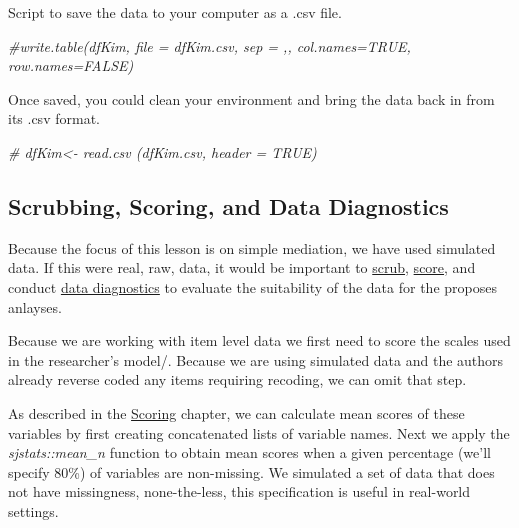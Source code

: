 \documentclass[
  11pt,
]{book}
\newenvironment{Shaded}{\begin{snugshade}}{\end{snugshade}}
\newcommand{\CommentTok}[1]{\textcolor[rgb]{0.37,0.37,0.37}{\textit{#1}}}
\begin{document}
Script to save the data to your computer as a .csv file.

\begin{Shaded}
\begin{Highlighting}[]
\CommentTok{\#write.table(dfKim, file = \textquotesingle{}dfKim.csv\textquotesingle{}, sep = \textquotesingle{},\textquotesingle{}, col.names=TRUE, row.names=FALSE) }
\end{Highlighting}
\end{Shaded}

Once saved, you could clean your environment and bring the data back in from its .csv format.

\begin{Shaded}
\begin{Highlighting}[]
\CommentTok{\# dfKim\textless{}{-} read.csv (\textquotesingle{}dfKim.csv\textquotesingle{}, header = TRUE)}
\end{Highlighting}
\end{Shaded}

\hypertarget{scrubbing-scoring-and-data-diagnostics}{%
\subsection{Scrubbing, Scoring, and Data Diagnostics}\label{scrubbing-scoring-and-data-diagnostics}}

Because the focus of this lesson is on simple mediation, we have used simulated data. If this were real, raw, data, it would be important to \href{https://lhbikos.github.io/ReC_MultivModel/scrub.html}{scrub}, \href{https://lhbikos.github.io/ReC_MultivModel/score.html}{score}, and conduct \href{https://lhbikos.github.io/ReC_MultivModel/DataDx.html}{data diagnostics} to evaluate the suitability of the data for the proposes anlayses.

Because we are working with item level data we first need to score the scales used in the researcher's model/. Because we are using simulated data and the authors already reverse coded any items requiring recoding, we can omit that step.

As described in the \href{https://lhbikos.github.io/ReC_MultivModel/score.html}{Scoring} chapter, we can calculate mean scores of these variables by first creating concatenated lists of variable names. Next we apply the \emph{sjstats::mean\_n} function to obtain mean scores when a given percentage (we'll specify 80\%) of variables are non-missing. We simulated a set of data that does not have missingness, none-the-less, this specification is useful in real-world settings.
\end{document}
